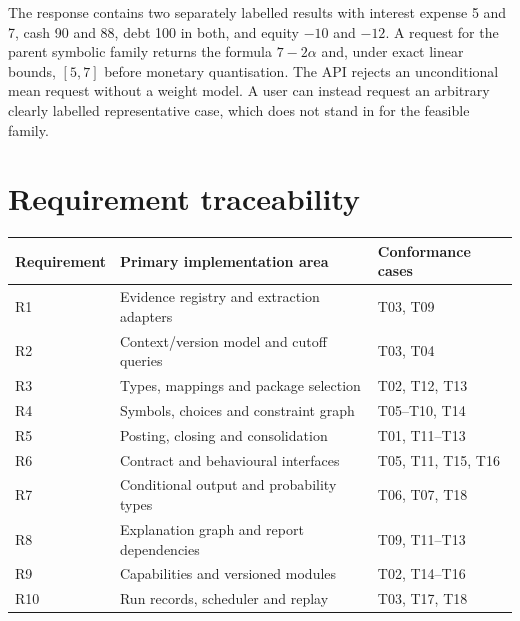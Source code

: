 The response contains two separately labelled results with interest expense
5 and 7, cash 90 and 88, debt 100 in both, and equity $-10$ and $-12$.
A request for the parent symbolic family returns the formula
$7-2\alpha$ and, under exact linear bounds, $[5,7]$ before monetary
quantisation. The API rejects an unconditional mean request without a weight
model. A user can instead request an arbitrary clearly labelled representative
case, which does not stand in for the feasible family.

\section{Requirement traceability}

\begin{center}
\begin{tabular}{lll}
\toprule Requirement & Primary implementation area & Conformance cases\\\midrule
R1 & Evidence registry and extraction adapters & T03, T09\\
R2 & Context/version model and cutoff queries & T03, T04\\
R3 & Types, mappings and package selection & T02, T12, T13\\
R4 & Symbols, choices and constraint graph & T05--T10, T14\\
R5 & Posting, closing and consolidation & T01, T11--T13\\
R6 & Contract and behavioural interfaces & T05, T11, T15, T16\\
R7 & Conditional output and probability types & T06, T07, T18\\
R8 & Explanation graph and report dependencies & T09, T11--T13\\
R9 & Capabilities and versioned modules & T02, T14--T16\\
R10 & Run records, scheduler and replay & T03, T17, T18\\\bottomrule
\end{tabular}
\end{center}
